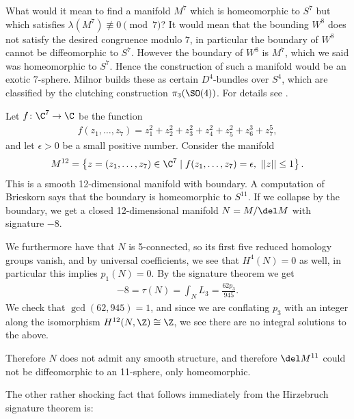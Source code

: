 \documentclass[11pt]{book}
\begin{document}
\begin{example}
What would it mean to find a manifold $M^7$ which is homeomorphic to $S^7$ but which satisfies $\lambda(M^7) \not\equiv 0 \pmod{7}$? It would mean that the bounding $W^8$ does not satisfy the desired congruence modulo $7$, in particular the boundary of $W^8$ cannot be diffeomorphic to $S^7$. However the boundary of $W^8$ is $M^7$, which we said was homeomorphic to $S^7$. Hence the construction of such a manifold would be an exotic $7$-sphere. Milnor builds these as certain $D^4$-bundles over $S^4$, which are classified by the clutching construction $\pi_3(\SO(4))$. For details see \cite{milnorManifoldsHomeomorphic7Sphere1956}.
\end{example}

\begin{example} Let $f \colon \C^7 \to \C$ be the function
\begin{align*}
    f(z_1, \ldots, z_7) = z_1^2 + z_2^2 + z_3^2 + z_4^2 + z_5^2 + z_6^3 + z_7^5,
\end{align*}
and let $\epsilon>0$ be a small positive number. Consider the manifold
\begin{align*}
    M^{12} = \left\{ z = (z_1, \ldots, z_7) \in \C^7 \mid f(z_1, \ldots, z_7) = \epsilon,\ ||z||\le 1 \right\}.
\end{align*}
This is a smooth 12-dimensional manifold with boundary. A computation of Brieskorn says that the boundary is homeomorphic to $S^{11}$. If we collapse by the boundary, we get a closed 12-dimensional manifold $N = M/\del M$ with signature $-8$.

We furthermore have that $N$ is 5-connected, so its first five reduced homology groups vanish, and by universal coefficients, we see that $H^4(N)=0$ as well, in particular this implies $p_1(N) = 0$. By the signature theorem we get
\begin{align*}
    -8 = \tau(N) = \int_N L_3 = \frac{62p_3}{945}.
\end{align*}
We check that $\gcd(62,945)=1$, and since we are conflating $p_3$ with an integer along the isomorphism $H^{12}(N,\Z) \cong \Z$, we see there are no integral solutions to the above.

Therefore $N$ does not admit any smooth structure, and therefore $\del M^{11}$ could not be diffeomorphic to an 11-sphere, only homeomorphic.
\end{example}

The other rather shocking fact that follows immediately from the Hirzebruch signature theorem is:
\end{document}
